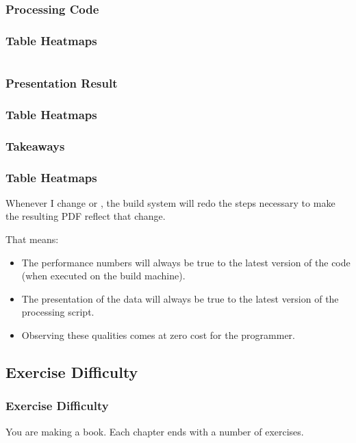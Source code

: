 {\subsubsection{Processing Code}
\begin{frame}[fragile]
  \frametitle{Table Heatmaps }
  \vspace{-5mm}
  \begin{multicols}{2}
    \inputminted[fontsize=\tiny,breaklines]{python}{../src/table_heatmap/process.py}
  \end{multicols}
\end{frame}

\subsubsection{Presentation Result}
\begin{frame}[fragile]
  \frametitle{Table Heatmaps }
  \vspace{24mm}
  \scalebox{0.9}{
    
  }
\end{frame}

\subsubsection{Takeaways}
\begin{frame}[fragile]
  \frametitle{Table Heatmaps }
  \vspace{3mm}
  Whenever I change  or , the build system will redo the steps necessary to make the resulting PDF reflect that change.
  
  \vspace{5mm}
  That means:
  \begin{itemize}
    \item The performance numbers will always be true to the latest version of the code (when executed on the build machine).
    \item The presentation of the data will always be true to the latest version of the processing script.
    \item Observing these qualities comes at zero cost for the programmer.
  \end{itemize}
\end{frame}

\subsection{Exercise Difficulty}
\begin{frame}[fragile]
  \frametitle{Exercise Difficulty}
  \vspace{3mm}
  You are making a book. Each chapter ends with a number of exercises.
  

\end{frame}}
